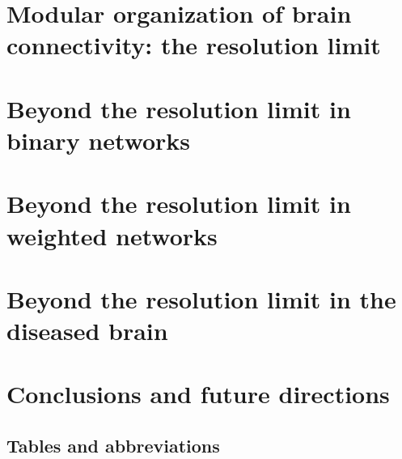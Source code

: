 \chapter{Modular organization of brain connectivity: the resolution limit}
\label{chap:modularorganization}
\vspace{2em}


\chapter{Beyond the resolution limit in binary networks}\label{chap:beyondresolutionlimitbinarynetworks}


\chapter{Beyond the resolution limit in weighted networks}
\label{chap:beyondresolutionlimitweightednetworks}


\chapter{Beyond the resolution limit in the diseased brain}



\chapter{Conclusions and future directions}





\begin{appendices}
\chapter{Tables and abbreviations}


%
\end{appendices}


